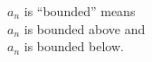 \documentclass[border=6pt]{standalone}
\begin{document}
\parbox{1.8in}{$a_n$ is ``bounded'' means \\
\null\quad $a_n$ is bounded above and \\
\null\quad $a_n$ is bounded below.}
\end{document}
